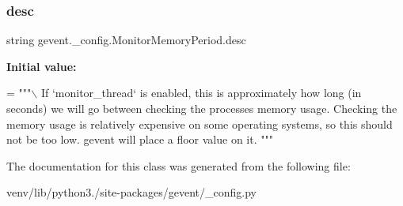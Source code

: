 \subsubsection{\texorpdfstring{desc}{desc}}
{\footnotesize\ttfamily string gevent.\+\_\+config.\+Monitor\+Memory\+Period.\+desc\hspace{0.3cm}{\ttfamily [static]}}

{\bfseries Initial value\+:}
\begin{DoxyCode}
=  \textcolor{stringliteral}{"""\(\backslash\)}
\textcolor{stringliteral}{If `monitor\_thread` is enabled, this is approximately how long}
\textcolor{stringliteral}{(in seconds) we will go between checking the processes memory usage.}
\textcolor{stringliteral}{}
\textcolor{stringliteral}{Checking the memory usage is relatively expensive on some operating}
\textcolor{stringliteral}{systems, so this should not be too low. gevent will place a floor}
\textcolor{stringliteral}{value on it.}
\textcolor{stringliteral}{"""}
\end{DoxyCode}


The documentation for this class was generated from the following file\+:\begin{DoxyCompactItemize}
\item 
venv/lib/python3./site-\/packages/gevent/\+\_\+config.\+py\end{DoxyCompactItemize}
